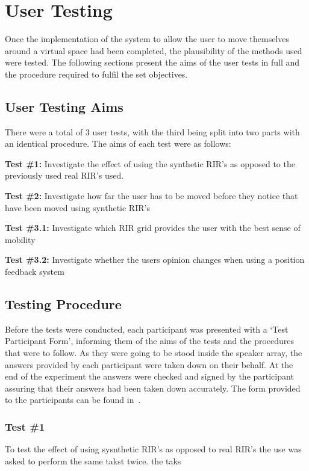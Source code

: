 \documentclass[../../main.tex]{subfiles}
\begin{document}
\section{User Testing}
	Once the implementation of the system to allow the user to move themselves around a virtual space had been completed, the plausibility of the methods used were tested. The following sections present the aims of the user tests in full and the procedure required to fulfil the set objectives.

	\subsection{User Testing Aims}
		There were a total of 3 user tests, with the third being split into two parts with an identical procedure. The aims of each test were as follows:

		\textbf{Test \#1:} Investigate the effect of using the synthetic \ac{RIR}'s as opposed to the previously used real \ac{RIR}'s used.

		\textbf{Test \#2:} Investigate how far the user has to be moved before they notice that have been moved using synthetic \ac{RIR}'s

		\textbf{Test \#3.1:} Investigate which \ac{RIR} grid provides the user with the best sense of mobility

		\textbf{Test \#3.2:}  Investigate whether the users opinion changes when using a position feedback system


	\subsection{Testing Procedure}
		Before the tests were conducted, each participant was presented with a `Test Participant Form', informing them of the aims of the tests and the procedures that were to follow. As they were going to be stood inside the speaker array, the answers provided by each participant were taken down on their behalf. At the end of the experiment the answers were checked and signed by the participant assuring that their answers had been taken down accurately. The form provided to the participants can be found in~.

		\subsubsection{Test \#1}

			To test the effect of using sysnthetic \ac{RIR}'s as opposed to real \ac{RIR}'s the use was asked to perform the same takst twice. the taks 
\end{document}
